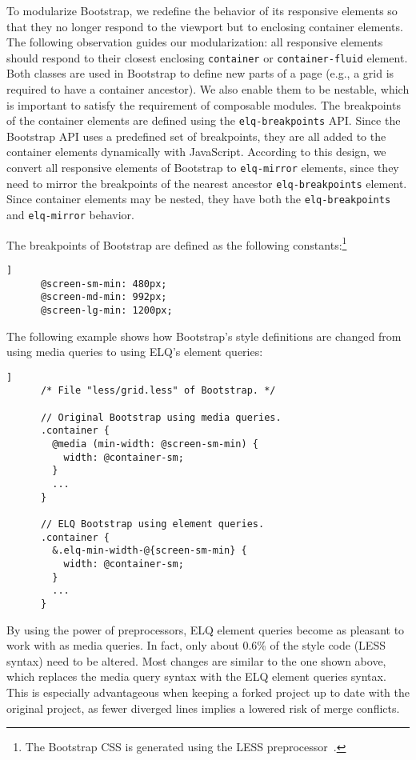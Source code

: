 \documentclass{llncs}
\newcommand{\code}[1]{\texttt{#1}}
\newcommand{\elq}{ELQ}
\begin{document}
    To modularize Bootstrap, we redefine the behavior of its responsive elements so that they no longer respond to the viewport but to enclosing container elements.
    The following observation guides our modularization: all responsive elements should respond to their closest enclosing \code{container} or \code{container-fluid} element.
    Both classes are used in Bootstrap to define new parts of a page (e.g., a grid is required to have a container ancestor).
    We also enable them to be nestable, which is important to satisfy the requirement of composable modules.
    The breakpoints of the container elements are defined using the \code{elq-breakpoints} API.
    Since the Bootstrap API uses a predefined set of breakpoints, they are all added to the container elements dynamically with JavaScript.
    According to this design, we convert all responsive elements of Bootstrap to \code{elq-mirror} elements, since they need to mirror the breakpoints of the nearest ancestor \code{elq-breakpoints} element.
    Since container elements may be nested, they have both the \code{elq-breakpoints} and \code{elq-mirror} behavior.

    The breakpoints of Bootstrap are defined as the following constants:\footnote{The Bootstrap CSS is generated using the LESS preprocessor~\cite{lesscss}.}
    \begin{lstlisting}[gobble=6,label={code:bootstrap-less-breakpoints},caption={},captionpos=b]]
      @screen-sm-min: 480px;
      @screen-md-min: 992px;
      @screen-lg-min: 1200px;
    \end{lstlisting}

    \noindent
    The following example shows how Bootstrap's style definitions are changed from using media queries to using \elq{}'s element queries:
    \begin{lstlisting}[gobble=6,label={code:bootstrap-less-breakpoints-usage},caption={},captionpos=b]]
      /* File "less/grid.less" of Bootstrap. */

      // Original Bootstrap using media queries.
      .container {
        @media (min-width: @screen-sm-min) {
          width: @container-sm;
        }
        ...
      }

      // ELQ Bootstrap using element queries.
      .container {
        &.elq-min-width-@{screen-sm-min} {
          width: @container-sm;
        }
        ...
      }
    \end{lstlisting}

    \noindent
    By using the power of preprocessors, \elq{} element queries become as pleasant to work with as media queries.
    In fact, only about 0.6\% of the style code (LESS syntax) need to be altered.
    Most changes are similar to the one shown above, which replaces the media query syntax with the \elq{} element queries syntax.
    This is especially advantageous when keeping a forked project up to date with the original project, as fewer diverged lines implies a lowered risk of merge conflicts.
\end{document}
